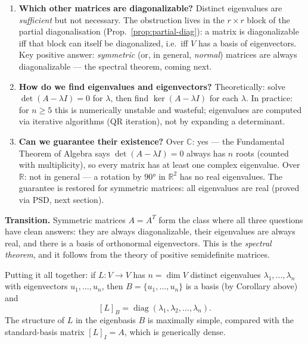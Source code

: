 \documentclass[11pt]{article}
\theoremstyle{definition}
\theoremstyle{plain}
\begin{document}
\begin{enumerate}
  \item \textbf{Which other matrices are diagonalizable?}
    Distinct eigenvalues are \emph{sufficient} but not necessary.
    The obstruction lives in the $r\times r$ block of the partial
    diagonalisation (Prop.~\ref{prop:partial-diag}): a matrix is
    diagonalizable iff that block can itself be diagonalized, i.e.\
    iff $V$ has a basis of eigenvectors.  Key positive answer:
    \emph{symmetric} (or, in general, \emph{normal}) matrices are
    always diagonalizable --- the spectral theorem, coming next.

  \item \textbf{How do we find eigenvalues and eigenvectors?}
    Theoretically: solve $\det(A - \lambda I) = 0$ for $\lambda$, then
    find $\ker(A - \lambda I)$ for each $\lambda$.  In practice: for
    $n \ge 5$ this is numerically unstable and wasteful; eigenvalues are
    computed via iterative algorithms (QR iteration), not by expanding a
    determinant.

  \item \textbf{Can we guarantee their existence?}
    Over $\mathbb{C}$: yes --- the Fundamental Theorem of Algebra says
    $\det(A - \lambda I) = 0$ always has $n$ roots (counted with
    multiplicity), so every matrix has at least one complex eigenvalue.
    Over $\mathbb{R}$: not in general --- a rotation by $90°$ in
    $\mathbb{R}^2$ has no real eigenvalues.  The guarantee is restored
    for symmetric matrices: all eigenvalues are real (proved via PSD,
    next section).
\end{enumerate}

\medskip\noindent
\textbf{Transition.}  Symmetric matrices $A = A^T$ form the class where
all three questions have clean answers: they are always diagonalizable,
their eigenvalues are always real, and there is a basis of orthonormal
eigenvectors.  This is the \emph{spectral theorem}, and it follows from
the theory of positive semidefinite matrices.


\medskip\noindent
Putting it all together: if $L\colon V\to V$ has $n = \dim V$ distinct
eigenvalues $\lambda_1,\ldots,\lambda_n$ with eigenvectors $u_1,\ldots,u_n$,
then $B = \{u_1,\ldots,u_n\}$ is a basis (by Corollary above) and
\[
  [L]_B = \operatorname{diag}(\lambda_1,\lambda_2,\ldots,\lambda_n).
\]
The structure of $L$ in the eigenbasis $B$ is maximally simple, compared
with the standard-basis matrix $[L]_I = A$, which is generically dense.
\end{document}

